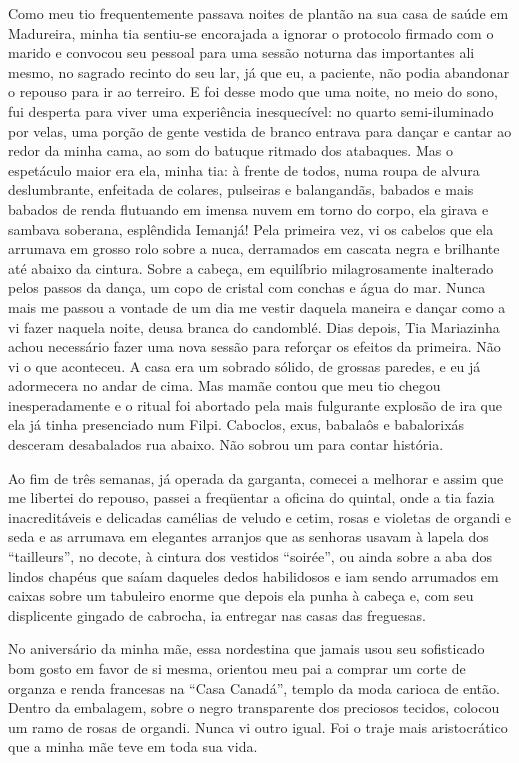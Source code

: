 Como meu tio frequentemente passava noites de plantão na sua casa de saúde em Madureira, minha tia sentiu-se encorajada a ignorar o protocolo firmado com o marido e convocou seu pessoal para uma sessão noturna das importantes ali mesmo, no sagrado recinto do seu lar, já que eu, a paciente, não podia abandonar o repouso para ir ao terreiro. 
E foi desse modo que uma noite, no meio do sono, fui desperta para viver uma experiência inesquecível: no quarto semi-iluminado por velas, uma porção de gente vestida de branco entrava para dançar e cantar ao redor da minha cama, ao som do batuque ritmado dos atabaques. 
Mas o espetáculo maior era ela, minha tia: à frente de todos, numa roupa de alvura deslumbrante, enfeitada de colares, pulseiras e balangandãs, babados e mais babados de renda flutuando em imensa nuvem em torno do corpo, ela girava e sambava soberana, esplêndida Iemanjá! 
Pela primeira vez, vi os cabelos que ela arrumava em grosso rolo sobre a nuca, derramados em cascata negra e brilhante até abaixo da cintura. 
Sobre a cabeça, em equilíbrio milagrosamente inalterado pelos passos da dança, um copo de cristal com conchas e água do mar.
 Nunca mais me passou a vontade de um dia me vestir daquela maneira e dançar como a vi fazer naquela noite, deusa branca do candomblé. 
Dias depois, Tia Mariazinha achou necessário fazer uma nova sessão para reforçar os efeitos da primeira. 
Não vi o que aconteceu. 
A casa era um sobrado sólido, de grossas paredes, e eu já adormecera no andar de cima. 
Mas mamãe contou que meu tio chegou inesperadamente e o ritual foi abortado pela mais fulgurante explosão de ira que ela já tinha presenciado num Filpi. 
Caboclos, exus, babalaôs e babalorixás desceram desabalados rua abaixo. Não sobrou um para contar história. 

Ao fim de três semanas, já operada da garganta, comecei a melhorar e assim que me libertei do repouso, passei a freqüentar a oficina do quintal, onde a tia fazia inacreditáveis e delicadas camélias de veludo e cetim, rosas e violetas de organdi e seda e as arrumava em elegantes arranjos que as senhoras usavam à lapela dos “tailleurs”, no decote, à cintura dos vestidos “soirée”, ou ainda sobre a aba dos lindos chapéus que saíam daqueles dedos habilidosos e iam sendo arrumados em caixas sobre um tabuleiro enorme que depois ela punha à cabeça e, com seu displicente gingado de cabrocha, ia entregar nas casas das freguesas.

No aniversário da minha mãe, essa nordestina que jamais usou seu sofisticado bom gosto em favor de si mesma, orientou meu pai a comprar um corte de organza e renda francesas na “Casa Canadá”, templo da moda carioca de então. 
Dentro da embalagem, sobre o negro transparente dos preciosos tecidos, colocou um ramo de rosas de organdi. 
Nunca vi outro igual. 
Foi o traje mais aristocrático que a minha mãe teve em toda sua vida. 

